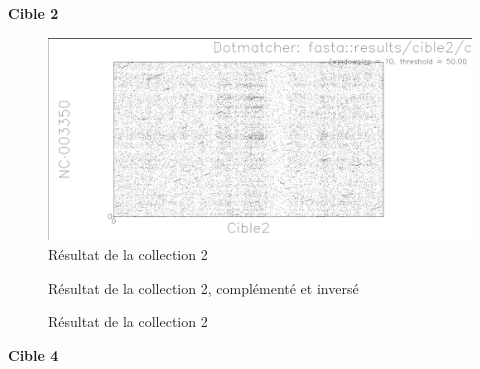 \FloatBarrier


\noindent\textbf{Cible 2}


\begin{figure}[!ht]
	\begin{minipage}[r]{.46\linewidth}
		\begin{center}
		\includegraphics[scale= 0.4]{../res/cible2.png}
		Résultat de la collection 2
	\end{center}
\end{minipage} \hfill
\begin{minipage}[c]{.46 \linewidth}
	\begin{center}
			Résultat de la collection 2, complémenté et inversé
		\end{center}
	\end{minipage}
	\caption{Résultat de la collection 2}
\end{figure}

\FloatBarrier


\noindent\textbf{Cible 4}

